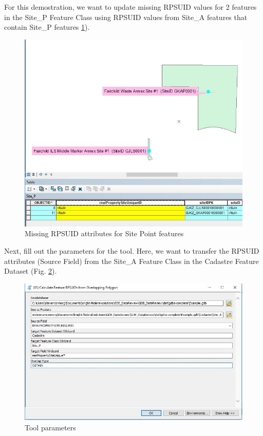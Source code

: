 \documentclass[openany]{book}
\theoremstyle{definition}
\theoremstyle{definition}
\theoremstyle{definition}
\theoremstyle{remark}
\begin{document}
For this demostration, we want to update missing RPSUID values for 2
features in the Site\_P Feature Class using RPSUID values from Site\_A
features that contain Site\_P features \ref{fig:sjcbefore}).

\begin{figure}[H]

{\centering \includegraphics{figures/spatjoinCalc-before} 

}

\caption{Missing RPSUID attributes for Site Point features}\label{fig:sjcbefore}
\end{figure}

Next, fill out the parameters for the tool. Here, we want to transfer
the RPSUID attributes (Source Field) from the Site\_A Feature Class in
the Cadastre Feature Dataset (Fig. \ref{fig:sjcparams}).

\begin{figure}[H]

{\centering \includegraphics{figures/spatjoinCalc-toolparams} 

}

\caption{Tool parameters}\label{fig:sjcparams}
\end{figure}
\end{document}
